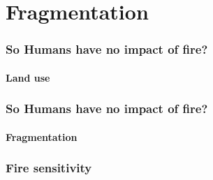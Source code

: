 \section{Fragmentation}


\begin{frame}
    \frametitle{So Humans have no impact of fire?}
    \framesubtitle{Land use}
\end{frame}

\begin{frame}
    \frametitle{So Humans have no impact of fire?}
    \framesubtitle{Fragmentation}
\end{frame}


\begin{frame}
    \frametitle{Fire sensitivity}
\end{frame}
